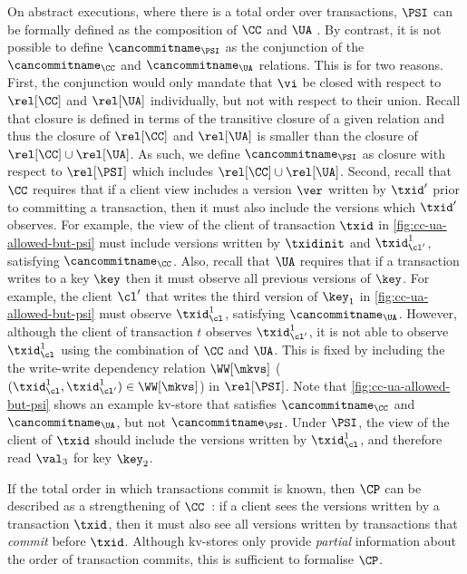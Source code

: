 On abstract executions, where there is a total order over transactions,  
\(\PSI\) can be formally defined as the composition of
 \(\CC\) and \(\UA\) \cite{framework-concur}. By contrast, it is not possible to define \(\cancommitname_{\PSI}\) as
the conjunction of the \(\cancommitname_{\CC}\) and
\(\cancommitname_{\UA}\) relations. 
This is for two reasons. 
First, the conjunction would only mandate that \(\vi\) be closed with respect to 
\(\rel[\CC]\) and \(\rel[\UA]\) {individually}, but {not} with respect to their {union}.
Recall that closure is defined in terms of the transitive closure of a given relation 
and thus the closure of \(\rel[\CC]\) and \(\rel[\UA]\) is smaller than the closure of \(\rel[\CC] \cup \rel[\UA]\).
As such, we define \(\cancommitname_{\PSI}\) as closure with respect to \(\rel[\PSI] \) which includes \( \rel[\CC] \cup \rel[\UA]\).
Second, recall that \(\CC\) requires that
if a client view includes 
a version \(\ver\) written by \( \txid' \) prior to committing a transaction, 
then it must also include the versions which \(\txid'\) observes.
For example, the  view of the client of transaction \( \txid \) in \cref{fig:cc-ua-allowed-but-psi}
must include versions written by \( \txidinit\) and \( \txid^{1}_{\cl'} \),
satisfying  \(\cancommitname_{\CC}\).
Also, recall that \(\UA\) requires that if  a transaction writes
to a key \(\key\) then it must  observe all previous versions of \(\key\).
For example, the client $\cl'$ 
that writes the third
version of \( \key_1 \) in \cref{fig:cc-ua-allowed-but-psi} must
observe \( \txid^{1}_{\cl} \), satisfying  \(\cancommitname_{\UA}\).
However,  although the client of  transaction $t$ observes \( \txid^{1}_{\cl'} \),
it is not able to observe \( \txid^{1}_{\cl} \) using the combination
of \(\CC\) and \(\UA\). 
This is fixed by including the 
the write-write dependency relation \(\WW[\mkvs]\) (\eg \(
(\txid^{1}_{\cl}, \txid^{1}_{\cl'} ) \in \WW[\mkvs] \)) in 
\(\rel[\PSI]\).
Note that \cref{fig:cc-ua-allowed-but-psi} 
shows an example kv-store that satisfies 
 \(\cancommitname_{\CC} \) and \( \cancommitname_{\UA}\), 
but not \(\cancommitname_{\PSI}\). 
Under \( \PSI \), the  view of the client of \( \txid \) should include the versions written by \( \txid^{1}_{\cl} \),
and therefore read \( \val_3 \) for key \( \key_2 \).

\label{para:cp}
If the total order in which transactions commit is known, then \(\CP\)
can be described as a strengthening of \(\CC\)~\cite{laws}: 
if a client sees the versions written by a transaction \(\txid\),
then it must also see all versions written by transactions that \emph{commit} before \(\txid\). 
Although kv-stores only provide \emph{partial} information about the
order of  transaction commits, 
this is sufficient to formalise $\CP$.

